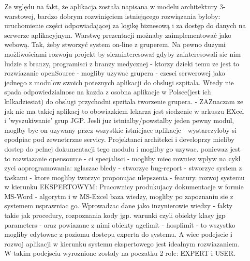Ze wględu na fakt, że aplikacja została napisana w modelu architektury 3-warstowej, bardzo dobrym rozwinięciem istniejącego rozwiązania byłoby: uruchomienie części odpowiadającej za logikę biznesową i za dostęp do danych na serwerze aplikacyjnym. Warstwę prezentacji możnaby zaimplementować jako webową. Tak, żeby stworzyć system on-line z gruperem. Na pewno dużymi możliwościami rozwoju projekt by siezainteresował gdyby zainteresowali sie nim ludzie  z branzy, programisci z branzy medycznej - ktorzy dzieki temu ze jest to rozwiazanie openSource - mogliby uzywac grupera - czesci serwerowej jako jednego z modulow swoich poteznych aplikacji do obslugi szpitala. Wtedy nie spada odpowiedzialnosc na kazda z osobna aplikacje w Polsce(jest ich kilkadziesiat) do obslugi przychodni spzitala tworzenie grupera. - ZAZnaczam ze jak nie ma takiej aplikacj to obowiazkiem lekarza jest siedzenie w arkuszu EXcel i 'wyszukiwanie' grup JGP. Jesli juz istnialby/powstalby jeden pewny modul, moglby byc on uzywany przez wszystkie istniejace aplikacje - wystarczyloby si epodpiac pod zewnetrrzne servicy. Projektanci architekci i developrzy mieliby dostep do pelnej dokumentacji tego modulu i mogliby go uzywac. poniewaz jest to rozwiazanie opensource - ci specjalisci - mogliby miec rowniez wplyw na cykl zyci aoprogramowania: zglaszac bledy - stworzyc bug-report - stworzyc system z taskami - ktore mogliby tworzyc proponujac ulepszenia - featury. 
rozwoj systemu w kierunku EKSPERTOWYM:
Pracownicy produkujacy dokumentacje w formie MS-Word - algorytm i w MS-Excel baza wiedzy, mogliby po zapoznaniu sie z systemem usprawniac go. Wprowadzac dane jako inzynierowie wiedzy - fakty takie jak procedury, rozpoznania kody jgp. warunki czyli obiekty klasy jgp parameters - oraz powiazane z nimi obiekty agelimit - hosplimit - to wszystko mogliby edytowac z poziomu dostepu experta do systemu.
A wiec podejscie i rozwoj aplikacji w kierunku systemu ekspertowego jest idealnym rozwiazaniem.
W takim podejsciu wyroznione zostaly na poczatku 2 role: EXPERT i USER.
